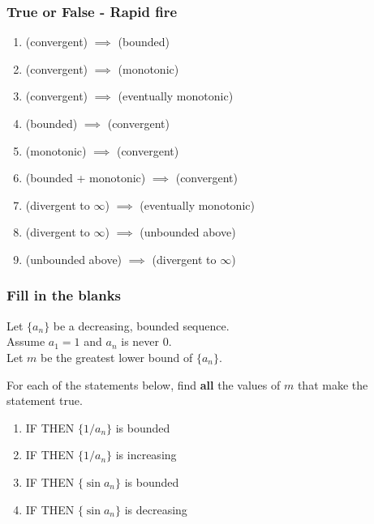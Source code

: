 \begin{frame}[t]
	\frametitle{True or False - Rapid fire}

	\begin{enumerate}
		\item (convergent) $\displaystyle \implies$ (bounded)
			\vfill

		\item (convergent) $\displaystyle \implies$ (monotonic)
			\vfill

		\item (convergent) $\displaystyle \implies$ (eventually monotonic)
			\vfill

		\item (bounded) $\displaystyle \implies$ (convergent)
			\vfill

		\item (monotonic) $\displaystyle \implies$ (convergent)
			\vfill

		\item (bounded + monotonic) $\displaystyle \implies$ (convergent)
			\vfill

		\item (divergent to $\infty$) $\displaystyle \implies$ (eventually monotonic)
			\vfill

		\item (divergent to $\infty$) $\displaystyle \implies$ (unbounded above)
			\vfill

		\item (unbounded above) $\displaystyle \implies$ (divergent to $\infty$)
	\end{enumerate}
	\vfill

	\vfill
\end{frame}

\begin{frame}[t]
	\fontsize{13}{13}\selectfont
	\frametitle{Fill in the blanks}

	Let $\displaystyle \{a_{n}\}$ be a decreasing, bounded sequence. \\ Assume $a_{1}
	= 1$ and $a_{n}$ is never $0$. \\ Let $m$ be the greatest lower bound of
	$\displaystyle \{a_{n}\}$.\\
	\medskip

	For each of the statements below, find \textbf{all} the values of $m$ that make
	the statement true.

	\begin{enumerate}
		\item IF \boxed{\phantom{????????????}} THEN $\displaystyle \{1/a_{n}\}$ is
			bounded

		\item IF \boxed{\phantom{????????????}} THEN $\displaystyle \{1/a_{n}\}$ is
			increasing

		\item IF \boxed{\phantom{????????????}} THEN $\displaystyle \{\sin a_{n}\}$
			is bounded

		\item IF \boxed{\phantom{????????????}} THEN $\displaystyle \{\sin a_{n}\}$
			is decreasing
	\end{enumerate}
\end{frame}

